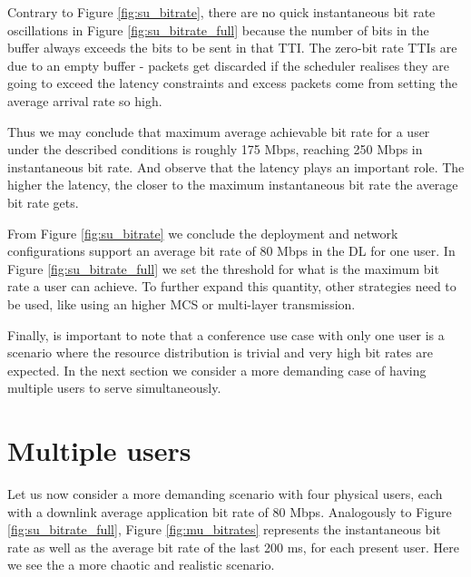 
Contrary to Figure \ref{fig:su_bitrate}, there are no quick instantaneous bit rate oscillations in Figure \ref{fig:su_bitrate_full} because the number of bits in the buffer always exceeds the bits to be sent in that TTI. The zero-bit rate TTIs are due to an empty buffer - packets get discarded if the scheduler realises they are going to exceed the latency constraints and excess packets come from setting the average arrival rate so high.

Thus we may conclude that maximum average achievable bit rate for a user under the described conditions is roughly 175 Mbps, reaching 250 Mbps in instantaneous bit rate. And observe that the latency plays an important role. The higher the latency, the closer to the maximum instantaneous bit rate the average bit rate gets. 

From Figure \ref{fig:su_bitrate} we conclude the deployment and network configurations support an average bit rate of 80 Mbps in the \ac{DL} for one user. In Figure \ref{fig:su_bitrate_full} we set the threshold for what is the maximum bit rate a user can achieve. To further expand this quantity, other strategies need to be used, like using an higher MCS or multi-layer transmission.

Finally, is important to note that a conference use case with only one user is a scenario where the resource distribution is trivial and very high bit rates are expected. In the next section we consider a more demanding case of having multiple users to serve simultaneously.


\pagebreak
\section{Multiple users} \label{sec:multi-user}

Let us now consider a more demanding scenario with four physical users, each with a downlink average application bit rate of 80 Mbps. Analogously to Figure \ref{fig:su_bitrate_full}, Figure \ref{fig:mu_bitrates} represents the instantaneous bit rate as well as the average bit rate of the last 200 ms, for each present user. Here we see the a more chaotic and realistic scenario. 


